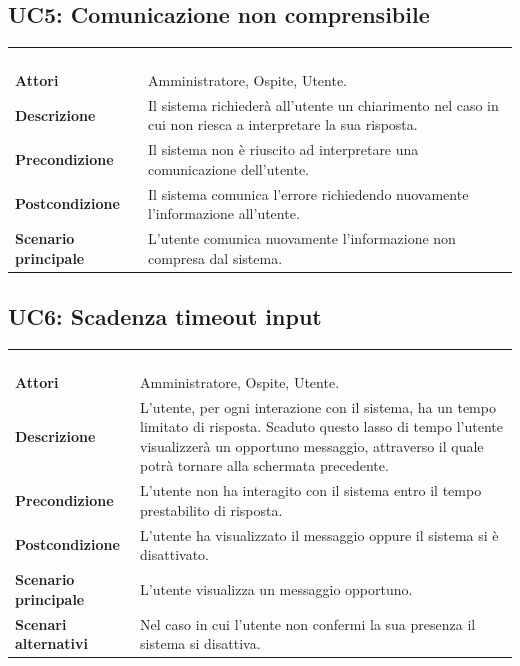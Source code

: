 \subsection{UC5: Comunicazione non comprensibile}
\label{UC5}
\begin{longtable}{l|p{10cm}}
\rowcolor[gray]{0.8} \multicolumn{2}{c}{} \\
\rowcolor[gray]{0.8} \multicolumn{2}{c}{\textbf{UC5 - Comunicazione non comprensibile}} \\
\rowcolor[gray]{0.8} \multicolumn{2}{c}{} \\
\hline
&\\
\textbf{Attori} & Amministratore, Ospite, Utente.\\[7pt]
\textbf{Descrizione} & Il sistema richiederà all'utente un chiarimento nel caso in cui non riesca a interpretare la sua risposta.\\[7pt]
\textbf{Precondizione} & Il sistema non è riuscito ad interpretare una comunicazione dell'utente.\\[7pt]
\textbf{Postcondizione} & Il sistema comunica l'errore richiedendo nuovamente l'informazione all'utente.\\[7pt]
\textbf{Scenario principale} &L'utente comunica nuovamente l'informazione non compresa dal sistema.\\[7pt]\hline
\end{longtable}

\subsection{UC6: Scadenza timeout input}
\label{UC6}
\begin{longtable}{l|p{10cm}}
\rowcolor[gray]{0.8} \multicolumn{2}{c}{} \\
\rowcolor[gray]{0.8} \multicolumn{2}{c}{\textbf{UC6 - Scadenza timeout input}} \\
\rowcolor[gray]{0.8} \multicolumn{2}{c}{} \\
\hline
&\\
\textbf{Attori} & Amministratore, Ospite, Utente.\\[7pt]
\textbf{Descrizione} & L'utente, per ogni interazione con il sistema, ha un tempo limitato di risposta. Scaduto questo lasso di tempo l'utente visualizzerà un opportuno messaggio, attraverso il quale potrà tornare alla schermata precedente.\\[7pt]
\textbf{Precondizione} & L'utente non ha interagito con il sistema entro il tempo prestabilito di risposta.\\[7pt]
\textbf{Postcondizione} & L'utente ha visualizzato il messaggio oppure il sistema si è disattivato.\\[7pt]
\textbf{Scenario principale} &L'utente visualizza un messaggio opportuno. \\[7pt]
\textbf{Scenari alternativi} & Nel caso in cui l'utente non confermi la sua presenza il sistema si disattiva.\\[7pt]\hline
\end{longtable}

